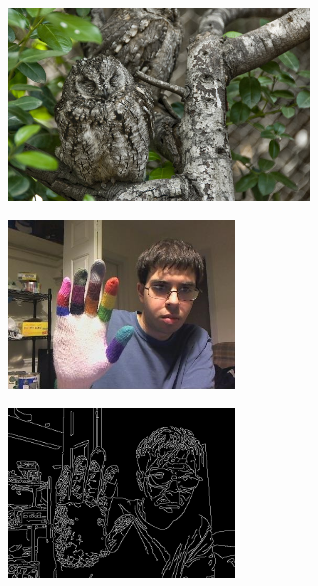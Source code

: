 \documentclass{beamer}
\begin{document}
\begin{frame}
  \begin{figure}[h]
\includegraphics[width = 8cm]{owl}    
  \end{figure}
\end{frame}


\begin{frame}
  \begin{figure}[h]
    \centering
\includegraphics[width = 6cm]{hand}    
  \end{figure}
\end{frame}


\begin{frame}
  \begin{figure}[h]
    \centering
\includegraphics[width = 6cm]{edgeFail}    
  \end{figure}
\end{frame}
\end{document}
